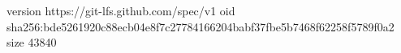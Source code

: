 version https://git-lfs.github.com/spec/v1
oid sha256:bde5261920c88ecb04e8f7c27784166204babf37fbe5b7468f62258f5789f0a2
size 43840
